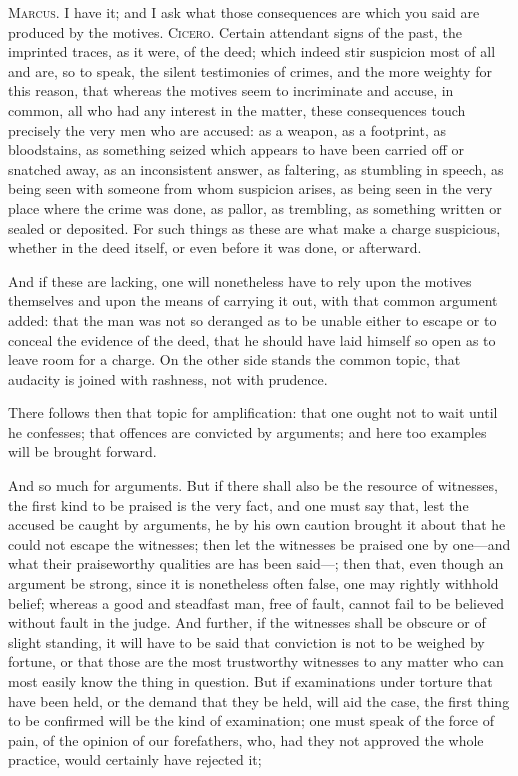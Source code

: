  \textsc{Marcus.} I have it; and I ask what those consequences are which you said are produced by the motives. \textsc{Cicero.} Certain attendant signs of the past, the imprinted traces, as it were, of the deed; which indeed stir suspicion most of all and are, so to speak, the silent testimonies of crimes, and the more weighty for this reason, that whereas the motives seem to incriminate and accuse, in common, all who had any interest in the matter, these consequences touch precisely the very men who are accused: as a weapon, as a footprint, as bloodstains, as something seized which appears to have been carried off or snatched away, as an inconsistent answer, as faltering, as stumbling in speech, as being seen with someone from whom suspicion arises, as being seen in the very place where the crime was done, as pallor, as trembling, as something written or sealed or deposited. For such things as these are what make a charge suspicious, whether in the deed itself, or even before it was done, or afterward.

 And if these are lacking, one will nonetheless have to rely upon the motives themselves and upon the means of carrying it out, with that common argument added: that the man was not so deranged as to be unable either to escape or to conceal the evidence of the deed, that he should have laid himself so open as to leave room for a charge. On the other side stands the common topic, that audacity is joined with rashness, not with prudence.

 There follows then that topic for amplification: that one ought not to wait until he confesses; that offences are convicted by arguments; and here too examples will be brought forward.

 And so much for arguments. But if there shall also be the resource of witnesses, the first kind to be praised is the very fact, and one must say that, lest the accused be caught by arguments, he by his own caution brought it about that he could not escape the witnesses; then let the witnesses be praised one by one—and what their praiseworthy qualities are has been said—; then that, even though an argument be strong, since it is nonetheless often false, one may rightly withhold belief; whereas a good and steadfast man, free of fault, cannot fail to be believed without fault in the judge. And further, if the witnesses shall be obscure or of slight standing, it will have to be said that conviction is not to be weighed by fortune, or that those are the most trustworthy witnesses to any matter who can most easily know the thing in question. But if examinations under torture that have been held, or the demand that they be held, will aid the case, the first thing to be confirmed will be the kind of examination; one must speak of the force of pain, of the opinion of our forefathers, who, had they not approved the whole practice, would certainly have rejected it;

